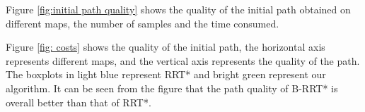 \documentclass[smallcondensed]{svjour3}     %
\begin{document}
Figure \ref{fig:initial path quality} shows the quality of the initial path obtained on different maps, the number of samples and the time consumed.

Figure \ref{fig: costs} shows the quality of the initial path, the horizontal axis represents different maps, and the vertical axis represents the quality of the path. The boxplots in light blue represent RRT* and bright green represent our algorithm.
It can be seen from the figure that the path quality of B-RRT* is overall better than that of RRT*.

\begin{figure}[h!]
	\centering
\end{figure}
\end{document}
